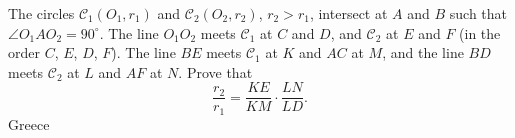 The circles $\mathcal C_1(O_1, r_1)$ and $\mathcal C_2(O_2, r_2)$,  $r_2 > r_1$,  intersect at $A$ and $B$ such that $\angle O_1AO_2 = 90^\circ$. The line $O_1O_2$ meets $\mathcal C_1$ at $C$ and $D$,  and $\mathcal C_2$ at $E$ and $F$ (in the order $C$,  $E$,  $D$,  $F$). The line $BE$ meets $\mathcal C_1$ at $K$ and $AC$ at $M$,  and the line $BD$ meets $\mathcal C_2$ at $L$ and $AF$ at $N$. Prove that\[ \frac{ r_2}{r_1} = \frac{KE}{KM} \cdot \frac{LN}{LD} . \]Greece